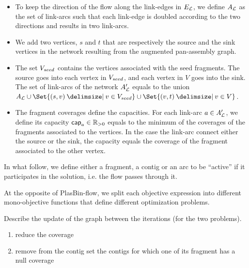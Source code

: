 \begin{itemize}
    \item To keep the direction of the flow along the link-edges in \(E_{\mathcal{L}}{}\), we define \(A_{\mathcal{L}}{}\) as the set of link-arcs such that each link-edge is doubled according to the two directions and results in two link-arcs.
    \item We add two vertices, \(s\) and \(t\) that are respectively the source and the sink vertices in the network resulting from the augmented pan-assembly graph.
    \item The set \(V_{seed}{}\) contains the vertices associated with the seed fragments. 
        The source goes into each vertex in \(V_{seed}{}\), and each vertex in \(V\) goes into the sink.
        The set of link-arcs of the network \(A'_{\mathcal{L}}{}\) equals to the union \(A_\Links{} \cup \Set{(s, v) \given v \in \VSeed{}} \cup \Set{(v, t) \given v \in V}\).
    \item The fragment coverages define the capacities.
        For each link-arc \(a \in A'_{\mathcal{L}}{}\), we define its capacity \(\mathsf{cap}_{a} \in \mathbb{R}_{>0}\) equals to the minimum of the coverages of the fragments associated to the vertices. 
        In the case the link-arc connect either the source or the sink, the capacity equals the coverage of the fragment associated to the other vertex.
\end{itemize}

In what follow, we define either a fragment, a contig or an arc to be \enquote{active} if it participates in the solution, i.e. the flow passes through it.

\begin{newfeatbox}
    At the opposite of PlasBin-flow, we split each objective expression into different mono-objective functions that define different optimization problems. 
\end{newfeatbox}

\begin{todobox}
    Describe the update of the graph between the iterations (for the two problems).

    \begin{enumerate}
        \item reduce the coverage
        \item remove from the contig set the contigs for which one of its fragment has a null coverage 
    \end{enumerate}
\end{todobox}









% 
